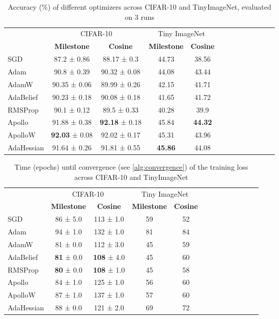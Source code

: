 \begin{table}[h!]
    \centering
    \caption{Accuracy (\%) of different optimizers across CIFAR-10 and TinyImageNet, evaluated on 3 runs}
    \label{tab:optimizer_comparison_acc}
    \begin{tabular}{lcccccccccccc}
        \toprule
        & \multicolumn{2}{c}{CIFAR-10} & \multicolumn{2}{c}{Tiny ImageNet} \\
        \cmidrule(lr){2-3} \cmidrule(lr){4-5}  \cmidrule(lr){6-7} 
        & \textbf{Milestone} & \textbf{Cosine}  & \textbf{Milestone} & \textbf{Cosine}    \\
        \midrule
        SGD         & 87.2 ± 0.86  & 88.17 ± 0.3 & 44.73  & 38.56  \\
        Adam        & 90.8 ± 0.39   & 90.32 ± 0.08  & 44.08 & 43.44    \\
        AdamW       & 90.35 ± 0.06  & 89.99 ± 0.26 & 42.15  & 41.71 \\
        AdaBelief   & 90.23 ± 0.18  & 90.08 ± 0.18 & 41.65 & 41.72 \\
        RMSProp     & 90.1 ± 0.12   & 89.5 ± 0.33  & 40.28 & 39.9\\
        Apollo      & 91.88 ± 0.38 & \textbf{92.18} ± 0.18  & 45.84  & \textbf{44.32}    \\
        ApolloW     & \textbf{92.03} ± 0.08 & 92.02 ± 0.17  & 45.31  & 43.96  \\
        AdaHessian  & 91.64 ± 0.26    &  91.81 ± 0.55 &   \textbf{45.86}& 44.08  \\
        \bottomrule
    \end{tabular}
\end{table}

\begin{table}[h!]
    \centering
    \caption{Time (epochs) until convergence (see \ref{alg:convergence}) of the training loss across CIFAR-10 and TinyImageNet}
    \label{tab:optimizer_comparison_ttc}
    \begin{tabular}{lcccccccccccc}
        \toprule
        & \multicolumn{2}{c}{CIFAR-10} & \multicolumn{2}{c}{Tiny ImageNet} \\
        \cmidrule(lr){2-3} \cmidrule(lr){4-5}  \cmidrule(lr){6-7} 
        & \textbf{Milestone} & \textbf{Cosine}  & \textbf{Milestone} & \textbf{Cosine}    \\
        \midrule
        SGD         & 86 ± 5.0 & 113 ± 1.0 & 59 & 52 \\
        Adam        & 94 ± 1.0 & 132 ± 1.0& 81 & 84  \\
        AdamW       & 81 ± 0.0 & 112 ± 3.0& 45 & 59 \\
        AdaBelief   & \textbf{81} ± 0.0  &  \textbf{108} ± 4.0& 45 & 60 \\
        RMSProp     & \textbf{80} ± 0.0  & \textbf{108} ± 1.0& 45 & 58\\
        Apollo      & 84 ± 1.0 & 125 ± 1.0& 56 & 60   \\
        ApolloW     & 87 ± 1.0 & 137 ± 1.0& 57 & 60  \\
        AdaHessian  & 88 ± 0.0 & 121 ± 2.0& 69 & 72 \\
        \bottomrule
    \end{tabular}
\end{table}
